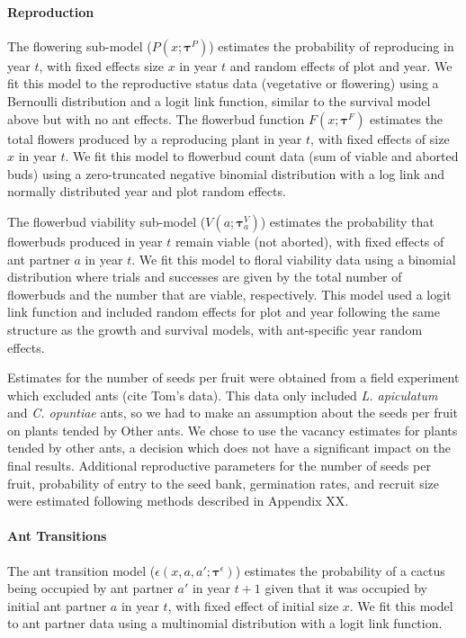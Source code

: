 \documentclass[11pt]{article}
\begin{document}
\paragraph{Reproduction}
The flowering sub-model ($P(x;\pmb{\tau}^{P})$) estimates the probability of reproducing in year $t$, with fixed effects size $x$ in year $t$ and random effects of plot and year.
We fit this model to the reproductive status data (vegetative or flowering) using a Bernoulli distribution and a logit link function, similar to the survival model above but with no ant effects.  
The flowerbud function $F(x;\pmb{\tau}^{F})$ estimates the total flowers produced by a reproducing plant in year $t$, with fixed effects of size $x$ in year $t$. 
We fit this model to flowerbud count data (sum of viable and aborted buds) using a zero-truncated negative binomial distribution with a log link and normally distributed year and plot random effects.

The flowerbud viability sub-model ($V(a;\pmb{\tau}^{V}_{a})$) estimates the probability that flowerbuds produced in year $t$ remain viable (not aborted), with fixed effects of ant partner $a$ in year $t$.
We fit this model to floral viability data using a binomial distribution where trials and successes are given by the total number of flowerbuds and the number that are viable, respectively.
This model used a logit link function and included random effects for plot and year following the same structure as the growth and survival models, with ant-specific year random effects. 

Estimates for the number of seeds per fruit were obtained from a field experiment which excluded ants (cite Tom's data).
This data only included  \textit{L. apiculatum} and \textit{C. opuntiae} ants, so we had to make an assumption about the seeds per fruit on plants tended by Other ants.
We chose to use the vacancy estimates for plants tended by other ants, a decision which does not have a significant impact on the final results. 
Additional reproductive parameters for the number of seeds per fruit, probability of entry to the seed bank, germination rates, and recruit size were estimated following methods described in Appendix XX.


\paragraph{Ant Transitions}
The ant transition model ($\epsilon(x,a,a';\pmb{\tau}^{\epsilon})$) estimates the probability of a cactus being occupied by ant partner $a'$ in year $t+1$ given that it was occupied by initial ant partner $a$  in year $t$, with fixed effect of initial size $x$.
We fit this model to ant partner data using a multinomial distribution with a logit link function. 
\end{document}
